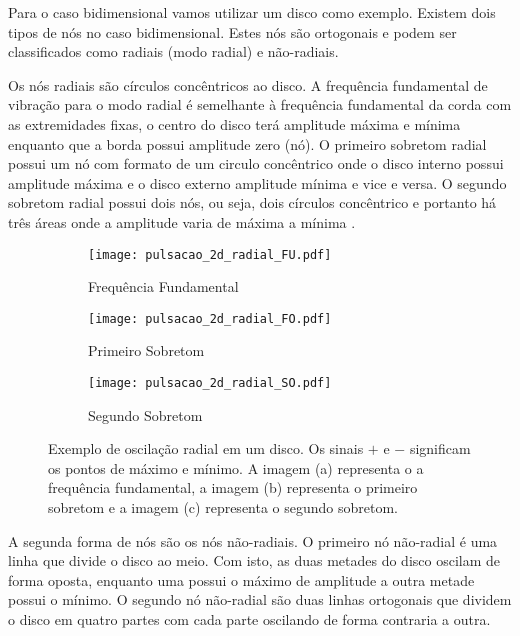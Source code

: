 Para o caso bidimensional vamos utilizar um disco como exemplo. Existem dois tipos de nós no caso bidimensional. Estes nós são ortogonais e podem ser classificados como radiais (modo radial) e não-radiais.

Os nós radiais são círculos concêntricos ao disco. A frequência fundamental de vibração para o modo radial é semelhante à frequência fundamental da corda com as extremidades fixas, o centro do disco terá amplitude máxima e mínima enquanto que a borda possui amplitude zero (nó). O primeiro sobretom radial possui um nó com formato de um circulo concêntrico onde o disco interno possui amplitude máxima e o disco externo amplitude mínima e vice e versa. O segundo sobretom radial possui dois nós, ou seja, dois círculos concêntrico e portanto há três áreas onde a amplitude varia de máxima a mínima \citep{astroseis}.

\begin{figure}[htb!]
\centering
\begin{subfigure}{.33\textwidth}
  \centering
  \texttt{[image: pulsacao\_2d\_radial\_FU.pdf]}
   \caption{Frequência Fundamental}
\end{subfigure}%
\begin{subfigure}{.33\textwidth}
  \centering
  \texttt{[image: pulsacao\_2d\_radial\_FO.pdf]}
  \caption{Primeiro Sobretom}
\end{subfigure}
\begin{subfigure}{.33\textwidth}
  \centering
  \texttt{[image: pulsacao\_2d\_radial\_SO.pdf]}
  \caption{Segundo Sobretom}
\end{subfigure}
\caption[Oscilação radial em um disco.]{Exemplo de oscilação radial em um disco. Os sinais $+$ e $-$ significam os pontos de máximo e mínimo. A imagem (a) representa o a frequência fundamental, a imagem (b) representa o primeiro sobretom e a imagem (c) representa o segundo sobretom.}
\label{fig:disco_radial}
\end{figure}

A segunda forma de nós são os nós não-radiais. O primeiro nó não-radial é uma linha que divide o disco ao meio. Com isto, as duas metades do disco oscilam de forma oposta, enquanto uma possui o máximo de amplitude a outra metade possui o mínimo. O segundo nó não-radial são duas linhas ortogonais que dividem o disco em quatro partes com cada parte oscilando de forma contraria a outra.

